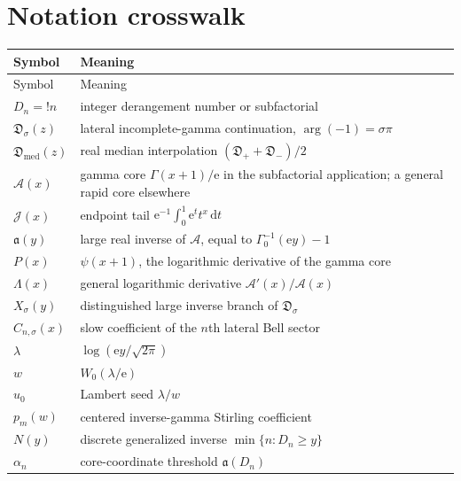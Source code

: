 \documentclass[11pt,a4paper]{article}
\numberwithin{equation}{section}
\theoremstyle{definition}
\theoremstyle{remark}
\newcommand{\e}{\mathrm e}
\newcommand{\dd}{\,\mathrm d}
\newcommand{\Sub}{\mathfrak D}
\newcommand{\Core}{\mathcal A}
\newcommand{\Tail}{\mathcal J}
\newcommand{\InvCore}{\mathfrak a}
\newcommand{\Lam}{\Lambda}
\newcommand{\med}{\mathrm{med}}
\begin{document}
\section{Notation crosswalk}
\label{app:notation}

\begin{longtable}{@{}p{}p{}@{}}
\toprule
Symbol & Meaning\\
\midrule
\endfirsthead
\toprule
Symbol & Meaning\\
\midrule
\endhead
$D_n={!n}$ & integer derangement number or subfactorial\\
$\Sub_\sigma(z)$ & lateral incomplete-gamma continuation, $\arg(-1)=\sigma\pi$\\
$\Sub_{\med}(z)$ & real median interpolation $(\Sub_++\Sub_-)/2$\\
$\Core(x)$ & gamma core $\Gamma(x+1)/\e$ in the subfactorial application; a general rapid core elsewhere\\
$\Tail(x)$ & endpoint tail $\e^{-1}\int_0^1\e^tt^x\dd t$\\
$\InvCore(y)$ & large real inverse of $\Core$, equal to $\Gamma_0^{-1}(\e y)-1$\\
$P(x)$ & $\psi(x+1)$, the logarithmic derivative of the gamma core\\
$\Lam(x)$ & general logarithmic derivative $\Core'(x)/\Core(x)$\\
$X_\sigma(y)$ & distinguished large inverse branch of $\Sub_\sigma$\\
$C_{n,\sigma}(x)$ & slow coefficient of the $n$th lateral Bell sector\\
$\lambda$ & $\log(\e y/\sqrt{2\pi})$\\
$w$ & $W_0(\lambda/\e)$\\
$u_0$ & Lambert seed $\lambda/w$\\
$p_m(w)$ & centered inverse-gamma Stirling coefficient\\
$N(y)$ & discrete generalized inverse $\min\{n:D_n\ge y\}$\\
$\alpha_n$ & core-coordinate threshold $\InvCore(D_n)$\\
\bottomrule
\end{longtable}
\end{document}

